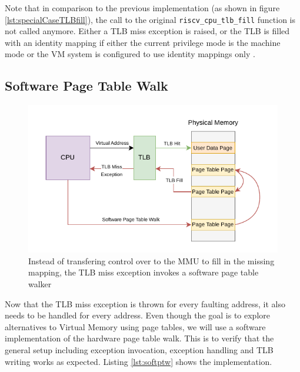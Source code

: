 Note that in comparison to the previous implementation (as shown in figure \ref{lst:specialCaseTLBfill}), the
call to the original \texttt{riscv\_cpu\_tlb\_fill} function is not called anymore.
Either a TLB miss exception is raised, or the TLB is filled with an identity mapping if either the current
privilege mode is the machine mode or the VM system is configured to use identity mappings only
\cite{RISCVInstructionSet}.


\subsection{Software Page Table Walk}


\begin{figure}[ht!]
    \centering
    \includegraphics[scale=1.5]{figures/theory_sw_ptw.pdf}
    \caption[Software Page Table Walker]{Instead of transfering control over to the MMU to fill in the missing mapping,
        the TLB miss exception invokes a software page table walker}
    \label{fig:theory:sw_ptw}
\end{figure}

Now that the TLB miss exception is thrown for every faulting address, it also needs to be handled
for every address.
Even though the goal is to explore alternatives to Virtual Memory using page tables, we will
use a software implementation of the hardware page table walk. This is to verify that the
general setup including exception invocation, exception handling and TLB writing works as
expected.
Listing \ref{lst:softptw} shows the implementation.

